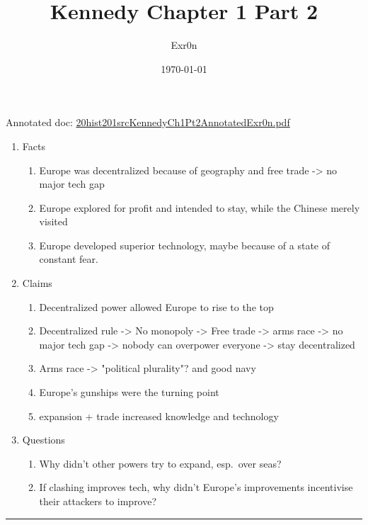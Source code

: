 \documentclass[letterpaper]{article}
\author{Exr0n}
\date{\today}
\title{Kennedy Chapter 1 Part 2}
\renewcommand\maketitle{}
\begin{document}
\maketitle
Annotated doc:
\href{20hist201srcKennedyCh1Pt2AnnotatedExr0n.pdf.org}{20hist201srcKennedyCh1Pt2AnnotatedExr0n.pdf}

\begin{enumerate}
\item Facts

\begin{enumerate}
\item Europe was decentralized because of geography and free trade -> no
major tech gap
\item Europe explored for profit and intended to stay, while the Chinese
merely visited
\item Europe developed superior technology, maybe because of a state of
constant fear.
\end{enumerate}

\item Claims

\begin{enumerate}
\item Decentralized power allowed Europe to rise to the top
\item Decentralized rule -> No monopoly -> Free trade -> arms race -> no
major tech gap -> nobody can overpower everyone -> stay
decentralized
\item Arms race -> "political plurality"? and good navy
\item Europe's gunships were the turning point
\item expansion + trade increased knowledge and technology
\end{enumerate}

\item Questions

\begin{enumerate}
\item Why didn't other powers try to expand, esp. over seas?
\item If clashing improves tech, why didn't Europe's improvements
incentivise their attackers to improve?
\end{enumerate}
\end{enumerate}

\noindent\rule{\textwidth}{0.5pt}
\end{document}
